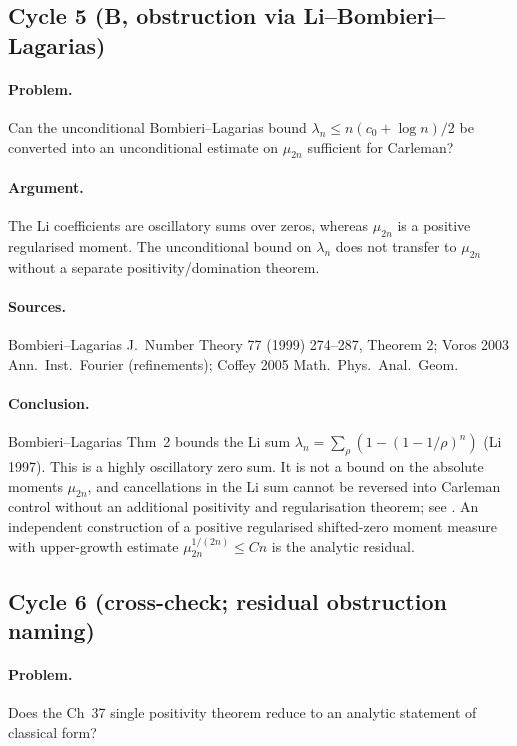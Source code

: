 \subsection{Cycle 5 (B, obstruction via Li--Bombieri--Lagarias)}
\label{v4-arith:hpar-det:cycle-5}

\paragraph{Problem.} Can the unconditional Bombieri--Lagarias bound
\(\lambda_{n}\leq n(c_{0}+\log n)/2\) be converted into an
unconditional estimate on \(\mu_{2n}\) sufficient for Carleman?

\paragraph{Argument.} The Li coefficients are oscillatory sums over
zeros, whereas \(\mu_{2n}\) is a positive regularised moment. The
unconditional bound on \(\lambda_{n}\) does not
transfer to \(\mu_{2n}\) without a separate positivity/domination
theorem.

\paragraph{Sources.} Bombieri--Lagarias J.~Number Theory 77
(1999) 274--287, Theorem 2; Voros 2003 Ann.~Inst.~Fourier (refinements);
Coffey 2005 Math.~Phys.~Anal.~Geom.

\paragraph{Conclusion.} Bombieri--Lagarias Thm~2 bounds the
Li sum
\(\lambda_{n}=\sum_{\rho}(1-(1-1/\rho)^{n})\) (Li 1997). This is a
highly oscillatory zero sum. It is not a bound on the absolute moments
\(\mu_{2n}\), and cancellations in the Li sum cannot be reversed into
Carleman control without an additional positivity and regularisation
theorem; see
. An independent
construction of a positive regularised shifted-zero moment measure with
upper-growth estimate \(\mu_{2n}^{1/(2n)}\le Cn\) is the analytic
residual.

\subsection{Cycle 6 (cross-check; residual obstruction naming)}
\label{v4-arith:hpar-det:cycle-6}

\paragraph{Problem.} Does the Ch~37 single positivity theorem reduce
to an analytic statement of classical form?

